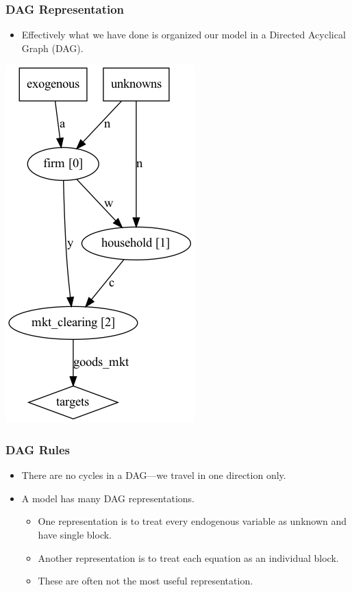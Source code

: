 \documentclass[english,xcolor=svgnames]{beamer}
\begin{document}
	\begin{frame}
		\frametitle{DAG Representation}
			\begin{itemize}
				\item Effectively what we have done is organized our model in a Directed Acyclical Graph (DAG).
			\end{itemize}
			\centering
			\includegraphics[scale=0.4]{dag/rbcsimple.png}
	\end{frame}

	\begin{frame}
		\frametitle{DAG Rules}
			\begin{itemize}
				\item There are no cycles in a DAG---we travel in one direction only.
				\item A model has many DAG representations.
				\begin{itemize}
					\item One representation is to treat every endogenous variable as unknown and have single block.
					\item Another representation is to treat each equation as an individual block.
					\item These are often not the most useful representation.
				\end{itemize}
			\end{itemize}
	\end{frame}
	
\end{document}
